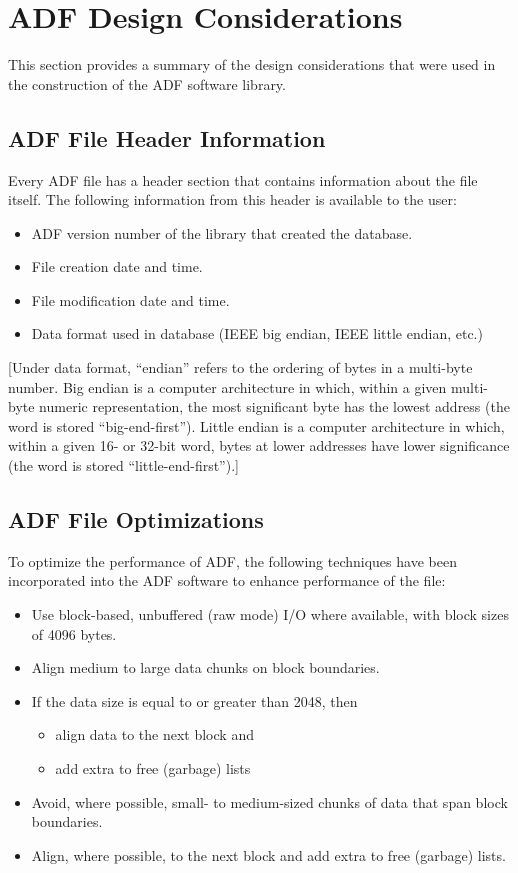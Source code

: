 \section{ADF Design Considerations}
\label{s:design}
\thispagestyle{plain}

This section provides a summary of the design considerations that were
used in the construction of the ADF software library.

\subsection{ADF File Header Information}

Every ADF file has a header section that contains information about the
file itself.
The following information from this header is available to the user:

\begin{itemize}
\item ADF version number of the library that created the database.
\item File creation date and time.
\item File modification date and time.
\item Data format used in database (IEEE big endian, IEEE little endian,
      etc.)
\end{itemize}

[Under data format, ``endian'' refers to the ordering of bytes in a
multi-byte number.
Big endian is a computer architecture in which, within a given
multi-byte numeric representation, the most significant byte has the
lowest address (the word is stored ``big-end-first'').
Little endian is a computer architecture in which, within a given 16- or
32-bit word, bytes at lower addresses have lower significance (the word
is stored ``little-end-first'').]

\subsection{ADF File Optimizations}

To optimize the performance of ADF, the following techniques have been
incorporated into the ADF software to enhance performance of the file:

\begin{itemize}
\item Use block-based, unbuffered (raw mode) I/O where available, with
      block sizes of 4096 bytes.
\item Align medium to large data chunks on block boundaries.
\item If the data size is equal to or greater than 2048, then
      \begin{itemize}
      \item align data to the next block and
      \item add extra to free (garbage) lists
      \end{itemize}
\item Avoid, where possible, small- to medium-sized chunks of data that
      span block boundaries.
\item Align, where possible, to the next block and add extra to free
      (garbage) lists.
\end{itemize}

